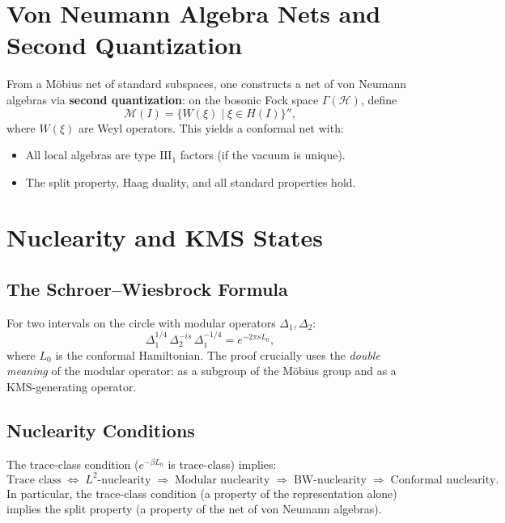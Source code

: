\documentclass[11pt,a4paper]{article}
\begin{document}
\section{Von Neumann Algebra Nets and Second Quantization}

From a M\"obius net of standard subspaces, one constructs a net of
von Neumann algebras via \textbf{second quantization}: on the bosonic
Fock space $\Gamma(\mathcal{H})$, define
\[
  \mathcal{M}(I) = \{W(\xi) \mid \xi \in H(I)\}'',
\]
where $W(\xi)$ are Weyl operators. This yields a conformal net with:
\begin{itemize}[nosep]
  \item All local algebras are type $\mathrm{III}_1$ factors (if the
        vacuum is unique).
  \item The split property, Haag duality, and all standard properties hold.
\end{itemize}

\section{Nuclearity and KMS States}

\subsection{The Schroer--Wiesbrock Formula}

For two intervals on the circle with modular operators $\Delta_1, \Delta_2$:
\begin{equation}
  \Delta_1^{1/4}\, \Delta_2^{-is}\, \Delta_1^{-1/4} = e^{-2\pi s L_0},
\end{equation}
where $L_0$ is the conformal Hamiltonian. The proof crucially uses the
\emph{double meaning} of the modular operator: as a subgroup of the
M\"obius group and as a KMS-generating operator.

\subsection{Nuclearity Conditions}

The trace-class condition ($e^{-\beta L_0}$ is trace-class) implies:
\begin{equation}
  \text{Trace class} \;\Longleftrightarrow\; L^2\text{-nuclearity}
  \;\Longrightarrow\; \text{Modular nuclearity}
  \;\Longrightarrow\; \text{BW-nuclearity}
  \;\Longrightarrow\; \text{Conformal nuclearity}.
\end{equation}
In particular, the trace-class condition (a property of the representation
alone) implies the split property (a property of the net of von Neumann
algebras).
\end{document}
